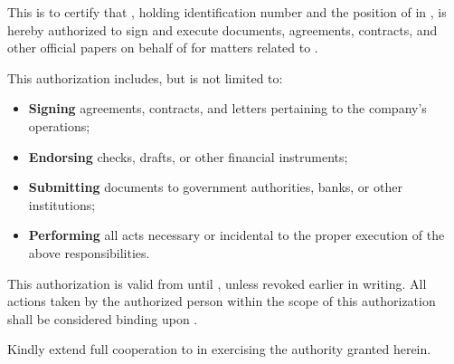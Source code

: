 
This is to certify that \authorizedPerson{}, holding identification number \authorizedPersonID{} and the position of \authorizedPersonPosition{} in \authorizedPersonCompany{}, is hereby authorized to sign and execute documents, agreements, contracts, and other official papers on behalf of \authorizedCompany{} for matters related to \authorizedScope{}.

This authorization includes, but is not limited to:

\begin{itemize}
  \item \textbf{Signing} agreements, contracts, and letters pertaining to the company’s operations;
  \item \textbf{Endorsing} checks, drafts, or other financial instruments;
  \item \textbf{Submitting} documents to government authorities, banks, or other institutions;
  \item \textbf{Performing} all acts necessary or incidental to the proper execution of the above responsibilities.
\end{itemize}

This authorization is valid from \authorizedStartDate{} until \authorizedEndDate{}, unless revoked earlier in writing. All actions taken by the authorized person within the scope of this authorization shall be considered binding upon \authorizedCompany{}.

Kindly extend full cooperation to \authorizedPerson{} in exercising the authority granted herein.

